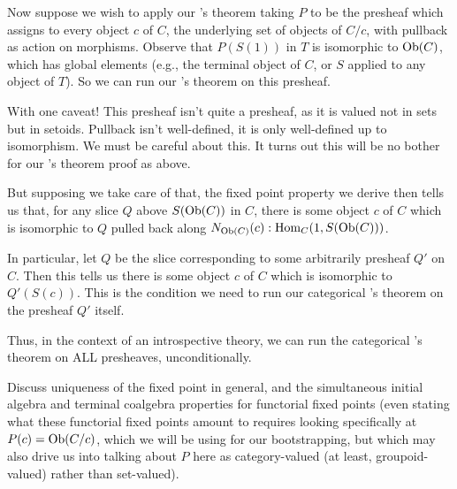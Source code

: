 Now suppose we wish to apply our \Loeb's theorem taking $P$ to be the presheaf which assigns to every object $c$ of $C$, the underlying set of objects of $C/c$, with pullback as action on morphisms. Observe that $P(S(1))$ in $T$ is isomorphic to $\operatorname{Ob}(C)$, which has global elements (e.g., the terminal object of $C$, or $S$ applied to any object of $T$). So we can run our \Loeb's theorem on this presheaf.

With one caveat! This presheaf isn't quite a presheaf, as it is valued not in sets but in setoids. Pullback isn't well-defined, it is only well-defined up to isomorphism. We must be careful about this. It turns out this will be no bother for our \Loeb's theorem proof as above. 

But supposing we take care of that, the fixed point property we derive then tells us that, for any slice $Q$ above $S(\operatorname{Ob}(C))$ in $C$, there is some object $c$ of $C$ which is isomorphic to $Q$ pulled back along $N_{\operatorname{Ob}(C)}(c) : \operatorname{Hom}_C(1, S(\operatorname{Ob}(C)))$.

In particular, let $Q$ be the slice corresponding to some arbitrarily presheaf $Q'$ on $C$. Then this tells us there is some object $c$ of $C$ which is isomorphic to $Q'(S(c))$. This is the condition we need to run our categorical \Loeb's theorem on the presheaf $Q'$ itself.

Thus, in the context of an introspective theory, we can run the categorical \Loeb's theorem on ALL presheaves, unconditionally.

\begin{TODOblock}
Discuss uniqueness of the fixed point in general, and the simultaneous initial algebra and terminal coalgebra properties for functorial fixed points (even stating what these functorial fixed points amount to requires looking specifically at $P(c) = \operatorname{Ob}(C/c)$, which we will be using for our bootstrapping, but which may also drive us into talking about $P$ here as category-valued (at least, groupoid-valued) rather than set-valued).
\end{TODOblock}